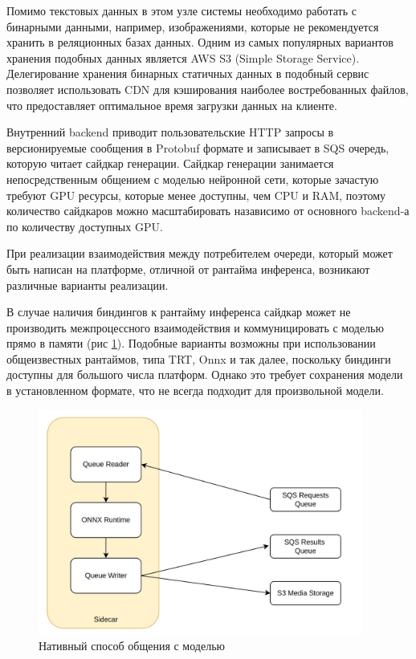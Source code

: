 Помимо текстовых данных в этом узле системы необходимо работать с бинарными данными, например, изображениями, которые
не рекомендуется хранить в реляционных базах данных. Одним из самых популярных вариантов хранения подобных данных
является AWS S3 (Simple Storage Service). Делегирование хранения бинарных статичных данных в подобный сервис позволяет
использовать CDN для кэширования наиболее востребованных файлов, что предоставляет оптимальное время загрузки данных на клиенте.

Внутренний backend приводит пользовательские HTTP запросы в версионируемые сообщения в Protobuf формате и
записывает в SQS очередь, которую читает сайдкар генерации. Сайдкар генерации занимается непосредственным общением
с моделью нейронной сети, которые зачастую требуют GPU ресурсы, которые менее доступны, чем CPU и RAM, поэтому
количество сайдкаров можно масштабировать назависимо от основного backend-а по количеству доступных GPU.

При реализации взаимодействия между потребителем очереди, который может быть написан на платформе, отличной
от рантайма инференса, возникают различные варианты реализации.

В случае наличия биндингов к рантайму инференса сайдкар может не производить межпроцессного взаимодействия
и коммуницировать с моделью прямо в памяти (рис \ref{fig:side1}). Подобные варианты возможны при использовании 
общеизвестных рантаймов, типа TRT, Onnx и так далее, поскольку биндинги доступны для большого числа платформ.
Однако это требует сохранения модели в установленном формате, что не всегда подходит для произвольной модели.


\begin{footnotesize}
\begin{figure}[H]
  \centering
  \includegraphics[width=0.95\textwidth]{img/side1.jpg}
  \caption{Нативный способ общения с моделью}
    \label{fig:side1}
\end{figure}
\end{footnotesize}

